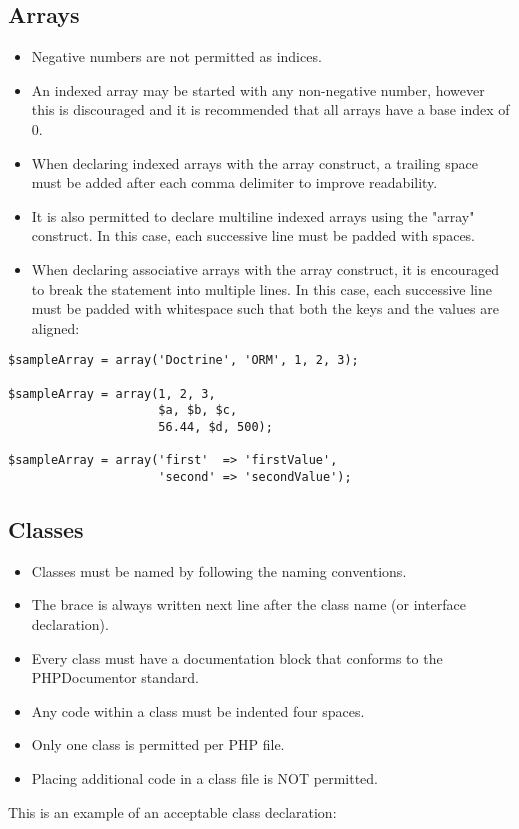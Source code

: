 \documentclass[11pt,a4paper]{report}
\begin{document}
\subsection{Arrays}
\begin{itemize}
\item{Negative numbers are not permitted as indices.}
\item{An indexed array may be started with any non-negative number, however this is discouraged and it is recommended that all arrays have a base index of 0.}
\item{When declaring indexed arrays with the array construct, a trailing space must be added after each comma delimiter to improve readability.}
\item{It is also permitted to declare multiline indexed arrays using the "array" construct. In this case, each successive line must be padded with spaces.}
\item{When declaring associative arrays with the array construct, it is encouraged to break the statement into multiple lines. In this case, each successive line must be padded with whitespace such that both the keys and the values are aligned:}
\end{itemize}
\begin{verbatim}
$sampleArray = array('Doctrine', 'ORM', 1, 2, 3);

$sampleArray = array(1, 2, 3,
                     $a, $b, $c,
                     56.44, $d, 500);

$sampleArray = array('first'  => 'firstValue',
                     'second' => 'secondValue');
\end{verbatim}

\subsection{Classes}
\begin{itemize}
\item{Classes must be named by following the naming conventions.}
\item{The brace is always written next line after the class name (or interface declaration).}
\item{Every class must have a documentation block that conforms to the PHPDocumentor standard.}
\item{Any code within a class must be indented four spaces.}
\item{Only one class is permitted per PHP file.}
\item{Placing additional code in a class file is NOT permitted.}
\end{itemize}
This is an example of an acceptable class declaration:
\end{document}
